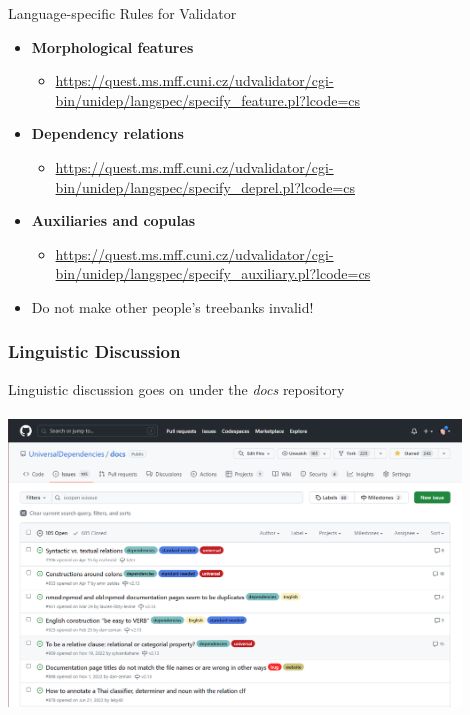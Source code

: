 \documentclass[10pt, compress, aspectratio=169]{beamer}
\begin{document}
\begin{frame}{Language-specific Rules for Validator}
  \begin{itemize}
    \item \textbf{Morphological features}
      \begin{itemize}
        \item
            \url{https://quest.ms.mff.cuni.cz/udvalidator/cgi-bin/unidep/langspec/specify_feature.pl?lcode=}\alert{\url{cs}}
      \end{itemize}
    \bigskip
    \item \textbf{Dependency relations}
      \begin{itemize}
        \item
            \url{https://quest.ms.mff.cuni.cz/udvalidator/cgi-bin/unidep/langspec/specify_deprel.pl?lcode=}\alert{\url{cs}}
      \end{itemize}
    \bigskip
    \item \textbf{Auxiliaries and copulas}
      \begin{itemize}
        \item
            \url{https://quest.ms.mff.cuni.cz/udvalidator/cgi-bin/unidep/langspec/specify_auxiliary.pl?lcode=}\alert{\url{cs}}
      \end{itemize}
    \bigskip
    \item \alert{Do not make other people's treebanks invalid!}
  \end{itemize}
\end{frame}


\begin{frame}
  \frametitle{Linguistic Discussion}
  \begin{center}
    Linguistic discussion goes on under the \emph{docs} repository \\
    ~\\
    \includegraphics[width=0.9\textwidth]{images/github-issues.png}
  \end{center}
\end{frame}
\end{document}
